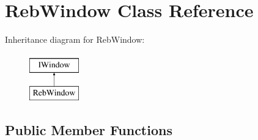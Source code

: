 \hypertarget{class_reb_window}{}\section{Reb\+Window Class Reference}
\label{class_reb_window}
Inheritance diagram for Reb\+Window\+:\begin{figure}[H]
\begin{center}
\leavevmode
\includegraphics[height=2.000000cm]{class_reb_window}
\end{center}
\end{figure}
\subsection*{Public Member Functions}
